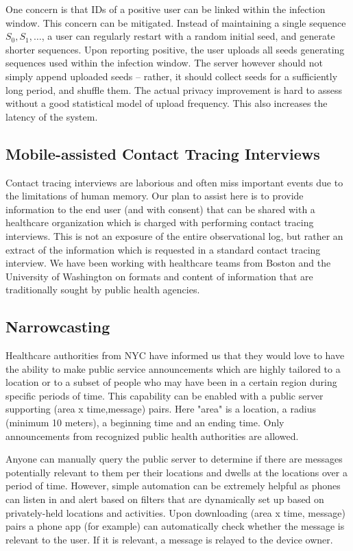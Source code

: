 \documentclass{article}
\begin{document}
 One concern is that IDs of a positive user can be linked within the infection window. This concern can be mitigated. Instead of maintaining a single sequence $S_0, S_1, \ldots$, a user can regularly restart with a random initial seed, and generate  shorter sequences. Upon reporting positive, the user uploads all seeds generating sequences used within the infection window. The server however should not simply append uploaded seeds -- rather, it should collect seeds for a sufficiently long period, and shuffle them. The actual privacy improvement is  hard to assess without a good statistical model of upload frequency. This also increases the latency of the system.

\subsection{Mobile-assisted Contact Tracing Interviews} 
Contact tracing interviews are laborious and often miss important events due to the limitations of human memory.  Our plan to assist here is to provide information to the end user (and with consent) that can be shared with a healthcare organization which is charged with performing contact tracing interviews.   This is not an exposure of the entire observational log, but rather an extract of the information which is requested in a standard contact tracing interview. We have been working with healthcare teams from Boston and the University of Washington on formats and content of information that are traditionally sought by public health agencies.

\subsection{Narrowcasting}

Healthcare authorities from NYC have informed us that they would love to have the ability to make public service announcements which are highly tailored to a location or to a subset of people who may have been in a certain region during specific periods of time.  This capability can be enabled with a public server supporting (area x time,message) pairs.  Here "area" is a location, a radius (minimum 10 meters), a beginning time and an ending time.  Only announcements from recognized public health authorities are allowed.  

Anyone can manually query the public server to determine if there are messages potentially relevant to them per their locations and dwells at the locations over a period of time. However, simple automation can be extremely helpful as phones can listen in and alert based on filters that are dynamically set up based on privately-held locations and activities. Upon downloading (area x time, message) pairs a phone app (for example) can automatically check whether the message is relevant to the user.  If it is relevant, a message is relayed to the device owner.
\end{document}
